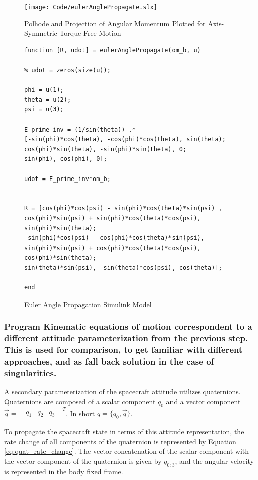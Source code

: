 \begin{figure}[H]
    \centering
    \captionsetup{justification = centering}
    \texttt{[image: Code/eulerAnglePropagate.slx]}
    \caption{Polhode and Projection of Angular Momentum Plotted for Axis-Symmetric Torque-Free Motion}
    \label{fig:axis_symmetric_polhode}
\end{figure}

\begin{figure} [H]
    \centering
    \begin{lstlisting}
function [R, udot] = eulerAnglePropagate(om_b, u)

% udot = zeros(size(u));

phi = u(1);
theta = u(2);
psi = u(3);

E_prime_inv = (1/sin(theta)) .* 
[-sin(phi)*cos(theta), -cos(phi)*cos(theta), sin(theta);
cos(phi)*sin(theta), -sin(phi)*sin(theta), 0;
sin(phi), cos(phi), 0];

udot = E_prime_inv*om_b;


R = [cos(phi)*cos(psi) - sin(phi)*cos(theta)*sin(psi) , cos(phi)*sin(psi) + sin(phi)*cos(theta)*cos(psi), sin(phi)*sin(theta);
-sin(phi)*cos(psi) - cos(phi)*cos(theta)*sin(psi), -sin(phi)*sin(psi) + cos(phi)*cos(theta)*cos(psi), cos(phi)*sin(theta);
sin(theta)*sin(psi), -sin(theta)*cos(psi), cos(theta)];

end
    \end{lstlisting}
    \caption{Euler Angle Propagation Simulink Model}
    \label{fig:euler_angle_prop_model}
\end{figure}

\subsubsection{Program Kinematic equations of motion correspondent to a different attitude parameterization from the previous step. This is used for comparison, to get familiar with different approaches, and as fall back solution in the case of singularities.}

A secondary parameterization of the spacecraft attitude utilizes quaternions. Quaternions are composed of a scalar component $q_0$ and a vector component $\vec{q} = \begin{bmatrix}  q_1 & q_2 & q_3  \end{bmatrix}^T$. In short $q = \{q_0, \vec{q}\}$. 

To propagate the spacecraft state in terms of this attitude representation, the rate change of all components of the quaternion is represented by Equation \ref{eq:quat_rate_change}. The vector concatenation of the scalar component with the vector component of the quaternion is given by $q_{0:3}$, and the angular velocity is represented in the body fixed frame.


